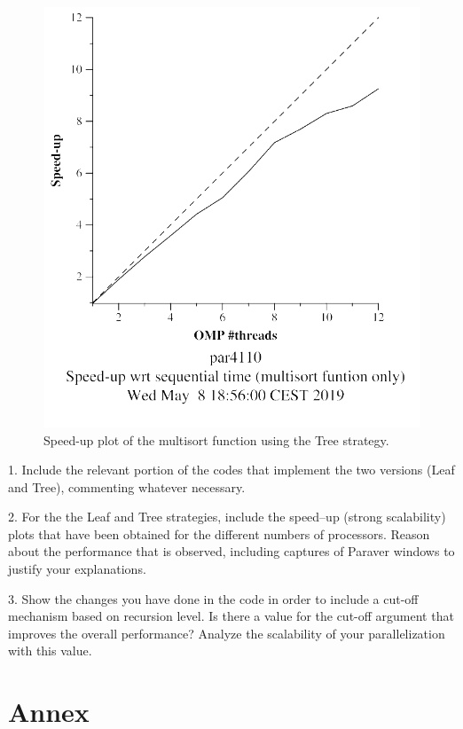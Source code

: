 \documentclass[12pt, a4paper]{article}
\begin{document}
\begin{figure}[H]
\begin{minipage}[b]{0.4\linewidth}
  \includegraphics[scale=0.5]{./S2/S2_strong_scalability/multisort-omp-strong_boada-4_tree_cutoff_multisort_only}
  \caption{Speed-up plot of the multisort function using the Tree strategy.}
  \label{fig:mandel-omp-10000-strong-21-speedup}
\end{minipage}
\end{figure}

\break

1. Include the relevant portion of the codes that implement the two versions (Leaf and Tree), commenting whatever necessary.

2. For the the Leaf and Tree strategies, include the speed–up (strong scalability) plots that have been
obtained for the different numbers of processors. Reason about the performance that is observed,
including captures of Paraver windows to justify your explanations.

3. Show the changes you have done in the code in order to include a cut-off mechanism based on
recursion level. Is there a value for the cut-off argument that improves the overall performance?
Analyze the scalability of your parallelization with this value.

\section{Annex}
\end{document}
